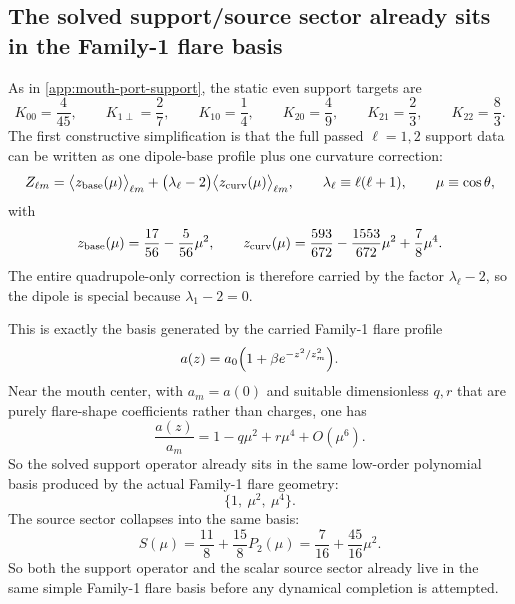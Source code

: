 \documentclass[11pt]{article}
\begin{document}
\subsection{The solved support/source sector already sits in the Family-1 flare basis}
\label{app:family1-basis}

As in \cref{app:mouth-port-support}, the static even support targets are
\begin{equation}
K_{00}=\frac{4}{45},
\qquad
K_{1\perp}=\frac{2}{7},
\qquad
K_{10}=\frac{1}{4},
\qquad
K_{20}=\frac{4}{9},
\qquad
K_{21}=\frac{2}{3},
\qquad
K_{22}=\frac{8}{3}.
\label{eq:family1-target-support-values}
\end{equation}
The first constructive simplification is that the full passed \(\ell=1,2\) support data
can be written as one dipole-base profile plus one curvature correction:
\begin{equation}
Z_{\ell m}
=
\big\langle z_{\rm base}(\mu)\big\rangle_{\ell m}
+
\bigl(\lambda_\ell-2\bigr)
\big\langle z_{\rm curv}(\mu)\big\rangle_{\ell m},
\qquad
\lambda_\ell\equiv \ell(\ell+1),
\qquad
\mu\equiv \cos\theta,
\label{eq:family1-zbase-zcurv}
\end{equation}
with
\begin{equation}
z_{\rm base}(\mu)=\frac{17}{56}-\frac{5}{56}\mu^2,
\qquad
z_{\rm curv}(\mu)=\frac{593}{672}-\frac{1553}{672}\mu^2+\frac78\mu^4.
\label{eq:family1-zbase-zcurv-profiles}
\end{equation}
The entire quadrupole-only correction is therefore carried by the factor
\(\lambda_\ell-2\), so the dipole is special because \(\lambda_1-2=0\).

This is exactly the basis generated by the carried Family-1 flare profile
\begin{equation}
a(z)=a_0\Bigl(1+\beta e^{-z^2/z_m^2}\Bigr).
\label{eq:family1-flare-profile}
\end{equation}
Near the mouth center, with \(a_m=a(0)\) and suitable dimensionless
\(q,r\) that are purely flare-shape coefficients rather than charges, one has
\begin{equation}
\frac{a(z)}{a_m}=1-q\mu^2+r\mu^4+O(\mu^6).
\label{eq:family1-flare-mu-expansion}
\end{equation}
So the solved support operator already sits in the same low-order polynomial basis
produced by the actual Family-1 flare geometry:
\begin{equation}
\{1,\ \mu^2,\ \mu^4\}.
\label{eq:family1-flare-basis}
\end{equation}
The source sector collapses into the same basis:
\begin{equation}
S(\mu)=\frac{11}{8}+\frac{15}{8}P_2(\mu)
=\frac{7}{16}+\frac{45}{16}\mu^2.
\label{eq:family1-source-mu-basis}
\end{equation}
So both the support operator and the scalar source sector already live in the same simple
Family-1 flare basis before any dynamical completion is attempted.
\end{document}
